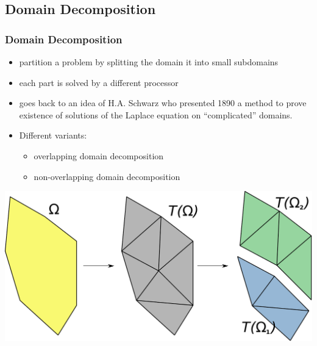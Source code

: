 \subsection{Domain Decomposition}
\begin{frame}
  \frametitle<presentation>{Domain Decomposition}

  \begin{itemize}
  \item partition a problem by splitting the domain it into small subdomains
  \item each part is solved by a different processor
  \item goes back to an idea of H.A. Schwarz who presented 1890 a method to prove existence of
        solutions of the Laplace equation on ``complicated'' domains.
  \item Different variants:
    \begin{itemize}
    \item overlapping domain decomposition
    \item non-overlapping domain decomposition
    \end{itemize}
  \end{itemize}
  
  \begin{center}
    \includegraphics[width=.6\linewidth]{EPS/dd}
  \end{center}

\end{frame}

